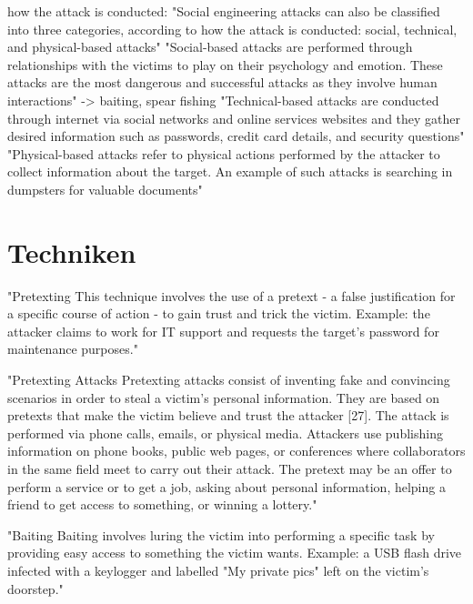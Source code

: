 how the attack is conducted:
"Social engineering attacks can also be classified into three categories, according to how the attack is conducted:
social, technical, and physical-based attacks"\cite{4_mdpi}
"Social-based attacks are performed through relationships with the victims to play on their psychology and emotion. These attacks are
the most dangerous and successful attacks as they involve human interactions"\cite{4_mdpi} -> baiting, spear fishing
"Technical-based attacks are conducted through internet via social networks and online services websites and they gather desired
information such as passwords, credit card details, and security questions"\cite{4_mdpi}
"Physical-based attacks refer to physical actions performed by the attacker to collect information about the target. An example
of such attacks is searching in dumpsters for valuable documents"\cite{4_mdpi}



\section{Techniken}


"Pretexting
This technique involves the use of a pretext -  a false justification for a specific course of action - to gain
trust and trick the victim.
Example: the attacker claims to work for IT support and requests the target's password for maintenance purposes."\cite{1_enisa}

"Pretexting Attacks
Pretexting attacks consist of inventing fake and convincing scenarios in order to steal a victim’s personal information.
They are based on pretexts that make the victim believe and trust the attacker [27]. The attack is performed via phone calls,
emails, or physical media. Attackers use publishing information on phone books, public web pages, or conferences where collaborators
in the same field meet to carry out their attack. The pretext may be an offer to perform a service or to get a job,
asking about personal information, helping a friend to get access to something, or winning a lottery."\cite{4_mdpi}

"Baiting
Baiting involves luring the victim into performing a specific task by providing easy access to something the victim wants.  
Example: a USB flash drive infected with a keylogger and labelled "My private pics" left on the victim's doorstep."\cite{1_enisa}

